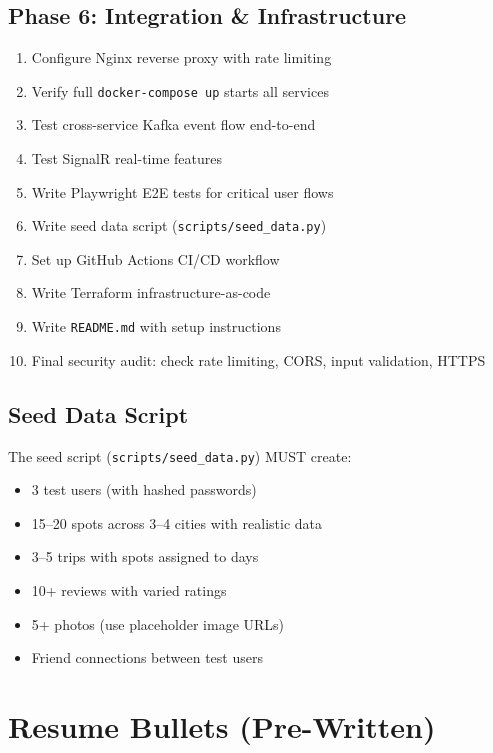 \documentclass[12pt,letterpaper]{article}
\begin{document}
\subsection{Phase 6: Integration \& Infrastructure}
\begin{enumerate}
  \item Configure Nginx reverse proxy with rate limiting
  \item Verify full \texttt{docker-compose up} starts all services
  \item Test cross-service Kafka event flow end-to-end
  \item Test SignalR real-time features
  \item Write Playwright E2E tests for critical user flows
  \item Write seed data script (\texttt{scripts/seed\_data.py})
  \item Set up GitHub Actions CI/CD workflow
  \item Write Terraform infrastructure-as-code
  \item Write \texttt{README.md} with setup instructions
  \item Final security audit: check rate limiting, CORS, input validation, HTTPS
\end{enumerate}

\subsection{Seed Data Script}
The seed script (\texttt{scripts/seed\_data.py}) MUST create:
\begin{itemize}
  \item 3 test users (with hashed passwords)
  \item 15--20 spots across 3--4 cities with realistic data
  \item 3--5 trips with spots assigned to days
  \item 10+ reviews with varied ratings
  \item 5+ photos (use placeholder image URLs)
  \item Friend connections between test users
\end{itemize}

\newpage

\section{Resume Bullets (Pre-Written)}
\end{document}
